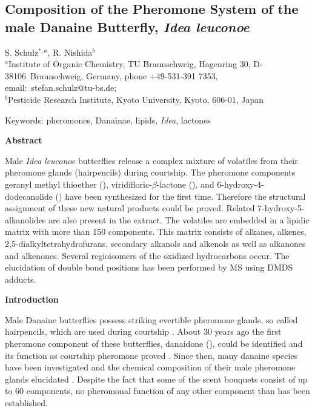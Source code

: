 \documentclass[11pt]{article}
\begin{document}
\begin{center}

\section*{Composition of the Pheromone System of the male Danaine Butterfly, \emph{Idea
leuconoe}}

S. Schulz$^{*,a}$, R. Nishida$^{b}$ \\ $^{a}$Institute of Organic Chemistry, TU
Braunschweig, Hagenring 30, D-38106~Braunschweig, Germany, phone +49-531-391 7353,
email:~stefan.schulz@tu-bs.de;
\\$^{b}$Pesticide Research Institute, Kyoto University, Kyoto, 606-01, Japan
\end{center}

\begin{center}
Keywords: pheromones, Danainae, lipids, \emph{Idea}, lactones
\end{center}
\begin{center}
\textbf{Abstract}
\end{center}

 Male \emph{Idea leuconoe} butterflies release a complex mixture
of volatiles from their pheromone glands (hairpencils) during courtship. The pheromone
components geranyl methyl thioether (), viridifloric-$\beta$-lactone
(), and 6-hydroxy-4-dodecanolide () have been synthesized for the
first time. Therefore the structural assignment of these new natural products could be
proved. Related 7-hydroxy-5-alkanolides are also present in the extract. The volatiles
are embedded in a lipidic matrix with more than 150 components. This matrix consists of
alkanes, alkenes, 2,5-dialkyltetrahydrofurans, secondary alkanols and alkenols as well as
alkanones and alkenones. Several regioisomers of the oxidized hydrocarbons occur. The
elucidation of  double bond  positions has been performed by MS using DMDS adducts.

\begin{center}
\textbf{Introduction}

\end{center}
 Male Danaine butterflies possess  striking evertible
pheromone glands, so called hairpencils,  which are used during courtship \cite{c1}.
About 30 years ago the first pheromone component of these butterflies, danaidone
(), could be identified \cite{c2} and its function as courtship pheromone
proved  \cite{c3}. Since then, many danaine species have been investigated and the
chemical composition of their male pheromone glands elucidated \cite{c1,c4,c7}. Despite
the fact that some of the scent bouquets  consist of up to 60 components, no pheromonal
function of any other component than  has been established.
\end{document}
